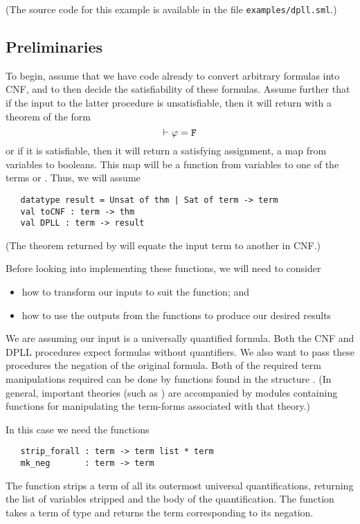 \smallskip
\noindent
(The source code for this example is available in the file \texttt{examples/dpll.sml}.)

\subsection*{Preliminaries}

To begin, assume that we have code already to convert arbitrary
formulas into CNF{}, and to then decide the satisfiability of these
formulas.  Assume further that if the input to the latter procedure is
unsatisfiable, then it will return with a theorem of the form
\[ \vdash \varphi = \holtxt{F}
\]
or if it is satisfiable, then it will return a satisfying assignment,
a map from variables to booleans.   This map will be a function from
\HOL{} variables to one of the \HOL{} terms  or .
Thus, we will assume
\begin{hol}
\begin{verbatim}
   datatype result = Unsat of thm | Sat of term -> term
   val toCNF : term -> thm
   val DPLL : term -> result
\end{verbatim}
\end{hol}
(The theorem returned by  will equate the input term to
another in CNF{}.)

\smallskip
\noindent
Before looking into implementing these functions, we will need to
consider
\begin{itemize}
\item how to transform our inputs to suit the function; and
\item how to use the outputs from the functions to produce our desired
  results
\end{itemize}

We are assuming our input is a universally quantified formula.  Both
the CNF and DPLL procedures expect formulas without quantifiers.  We
also want to pass these procedures the negation of the original
formula.  Both of the required term manipulations required can be done
by functions found in the structure .  (In general,
important theories (such as ) are accompanied by
 modules containing functions for manipulating the
term-forms associated with that theory.)

In this case we need the functions
\begin{hol}
\begin{verbatim}
   strip_forall : term -> term list * term
   mk_neg       : term -> term
\end{verbatim}
\end{hol}
The function  strips a term of all its outermost
universal quantifications, returning the list of variables stripped
and the body of the quantification.  The function  takes a
term of type  and returns the term corresponding to its
negation.


